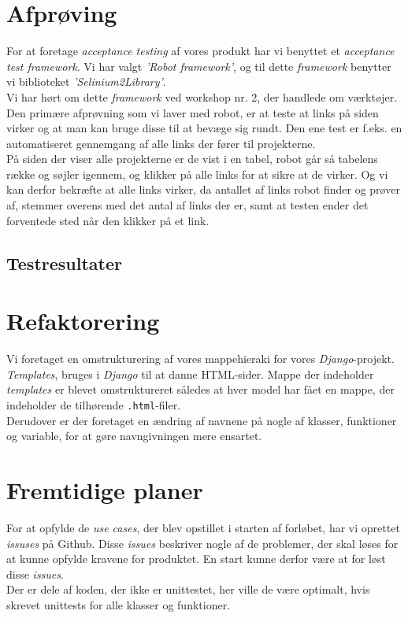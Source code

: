 \documentclass[11pt]{article}
\begin{document}
\section{Afprøving}
For at foretage \textit{acceptance testing} af vores produkt har vi benyttet et \textit{acceptance test framework}. Vi har valgt \textit{'Robot framework'}, og til dette \textit{framework} benytter vi biblioteket \textit{'Selinium2Library'}. \\
Vi har hørt om dette \textit{framework} ved workshop nr. 2, der handlede om værktøjer.\\
Den primære afprøvning som vi laver med robot, er at teste at links på siden virker og at man kan bruge disse til at bevæge sig rundt. Den ene test er f.eks. en automatiseret gennemgang af alle links der fører til projekterne. \\
På siden der viser alle projekterne er de vist i en tabel, robot går så tabelens række og søjler igennem, og klikker på alle links for at sikre at de virker. Og vi kan derfor bekræfte at alle links virker, da antallet af links robot finder og prøver af, stemmer overens med det antal af links der er, samt at testen ender det forventede sted når den klikker på et link.

\subsection{Testresultater}

\section{Refaktorering}
Vi foretaget en omstrukturering af vores mappehieraki for vores \textit{Django}-projekt. \textit{Templates}, bruges i \textit{Django} til at danne HTML-sider. Mappe der indeholder \textit{templates} er blevet omstruktureret således at hver model har fået en mappe, der indeholder de tilhørende \texttt{.html}-filer. \\
Derudover er der foretaget en ændring af navnene på nogle af klasser, funktioner og variable, for at gøre navngivningen mere ensartet.

\section{Fremtidige planer}
For at opfylde de \textit{use cases}, der blev opstillet i starten af forløbet, har vi oprettet \textit{issuses} på Github. Disse \textit{issues} beskriver nogle af de problemer, der skal løses for at kunne opfylde kravene for produktet. En start kunne derfor være at for løst disse \textit{issues}. \\
Der er dele af koden, der ikke er unittestet, her ville de være optimalt, hvis skrevet unittests for alle klasser og funktioner.
\end{document}

